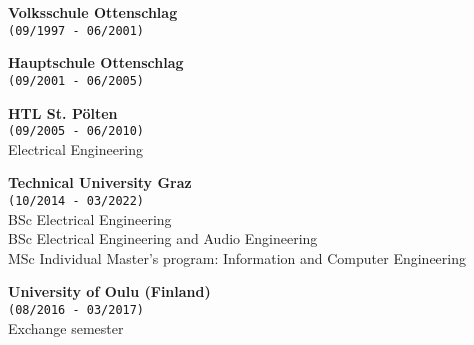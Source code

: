 

\textbf{Volksschule Ottenschlag}\\
\texttt{(09/1997 - 06/2001)}

\textbf{Hauptschule Ottenschlag}\\
\texttt{(09/2001 - 06/2005)}

\textbf{HTL St. Pölten}\\
\texttt{(09/2005 - 06/2010)}\\
Electrical Engineering

\textbf{Technical University Graz}\\
\texttt{(10/2014 - 03/2022)}\\
BSc Electrical Engineering\\
BSc Electrical Engineering and Audio Engineering\\
MSc Individual Master's program: Information and Computer Engineering

\textbf{University of Oulu (Finland)}\\
\texttt{(08/2016 - 03/2017)}\\
Exchange semester\\